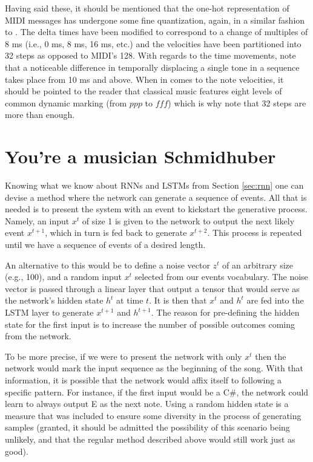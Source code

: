 \documentclass[a4paper]{book}
\begin{document}
Having said these, it should be mentioned that the one-hot representation of MIDI messages has undergone some fine quantization, again, in a similar fashion to \textcite{oore_this_2018}. The delta times have been modified to correspond to a change of multiples of 8 ms (i.e., 0 ms, 8 ms, 16 ms, etc.) and the velocities have been partitioned into 32 steps as opposed to MIDI's 128. With regards to the time movements, \textcite{friberg_overview_2006} note that a noticeable difference in temporally displacing a single tone in a sequence takes place from 10 ms and above. When in comes to the note velocities, it should be pointed to the reader that classical music features eight levels of common dynamic marking (from $ppp$ to $fff$) which is why \textcite{oore_this_2018} note that 32 steps are more than enough.

\section{You're a musician Schmidhuber} \label{sec:how_to_gen}

Knowing what we know about RNNs and LSTMs from Section \ref{sec:rnn} one can devise a method where the network can generate a sequence of events. All that is needed is to present the system with an event to kickstart the generative process. Namely, an input $x^t$ of size 1 is given to the network to output the next likely event $x^{t+1}$, which in turn is fed back to generate $x^{t+2}$. This process is repeated until we have a sequence of events of a desired length.

An alternative to this would be to define a noise vector $z^t$ of an arbitrary size (e.g., 100), and a random input $x^t$ selected from our events vocabulary. The noise vector is passed through a linear layer that output a tensor that would serve as the network's hidden state $h^{t}$ at time $t$. It is then that $x^t$ and $h^{t}$ are fed into the LSTM layer to generate $x^{t+1}$ and $h^{t+1}$. The reason for pre-defining the hidden state for the first input is to increase the number of possible outcomes coming from the network.

To be more precise, if we were to present the network with only $x^t$ then the network would mark the input sequence as the beginning of the song. With that information, it is possible that the network would affix itself to following a specific pattern. For instance, if the first input would be a C\#, the network could learn to always output E as the next note. Using a random hidden state is a measure that was included to ensure some diversity in the process of generating samples (granted, it should be admitted the possibility of this scenario being unlikely, and that the regular method described above would still work just as good).
\end{document}
